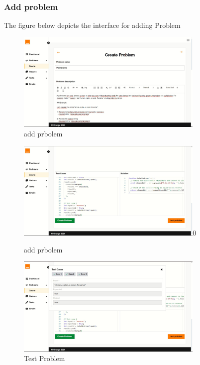     \subsubsection{Add problem}
    The figure below depicts the interface for adding Problem
    \begin{figure}[h!]
        \centering*
        \includegraphics[width=0.8\textwidth]{images/prb.JPG}
        \caption{add prbolem}
        \label{fig:add prbolem}
    \end{figure}
    \begin{figure}[h!]
        \centering*
        \includegraphics[width=0.8\textwidth]{images/prb2.JPG}0
        \caption{add prbolem}
        \label{fig:add prbolem}
    \end{figure}

    \begin{figure}[h!]
        \centering*
        \includegraphics[width=0.8\textwidth]{images/prb3.JPG}
        \caption{Test Problem}
        \label{fig:Test Problem}
    \end{figure}
